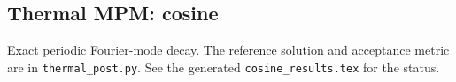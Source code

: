\subsection{Thermal MPM: cosine}
Exact periodic Fourier-mode decay. The reference solution and acceptance metric are in \texttt{thermal\_post.py}. See the generated \texttt{cosine\_results.tex} for the status.
